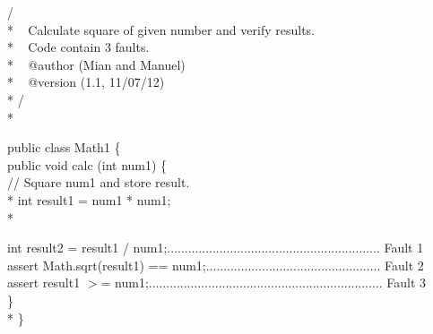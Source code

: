 \documentclass[conference]{IEEEtran}
\begin{document}
\noindent
/\textasteriskcentered \textasteriskcentered \\*
\textasteriskcentered   ~ Calculate square of given number and verify results. \\*
\textasteriskcentered   ~ Code contain 3 faults.\\*
\textasteriskcentered   ~ @author (Mian and Manuel) \\* 
\textasteriskcentered   ~ @version (1.1, 11/07/12)\\*
\textasteriskcentered / \\*

\noindent public class Math1 \{\\
\indent public void calc (int num1) \{\\

\indent // Square num1 and store result.\\*
\indent int result1 = num1 * num1;\\*

\indent int result2 = result1 / num1;............................................................. Fault 1\\

\indent assert Math.sqrt(result1) == num1;.................................................. Fault 2\\

\indent assert result1 $>$= num1;................................................................... Fault 3\\
\indent \}  \\*
\noindent\}\\
\end{document}
